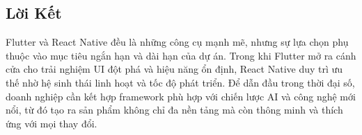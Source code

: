 \subsection{Lời Kết}
\renewcommand{\labelitemi}{--}    
    \begin{flushleft}
        \hspace*{0.8cm}Flutter và React Native đều là những công cụ mạnh mẽ, nhưng sự lựa chọn phụ thuộc vào mục tiêu ngắn hạn và dài hạn của dự án. Trong khi Flutter mở ra cánh cửa cho trải nghiệm UI đột phá và hiệu năng ổn định, React Native duy trì ưu thế nhờ hệ sinh thái linh hoạt và tốc độ phát triển. Để dẫn đầu trong thời đại số, doanh nghiệp cần kết hợp framework phù hợp với chiến lược AI và công nghệ mới nổi, từ đó tạo ra sản phẩm không chỉ đa nền tảng mà còn thông minh và thích ứng với mọi thay đổi.
    \end{flushleft}
    